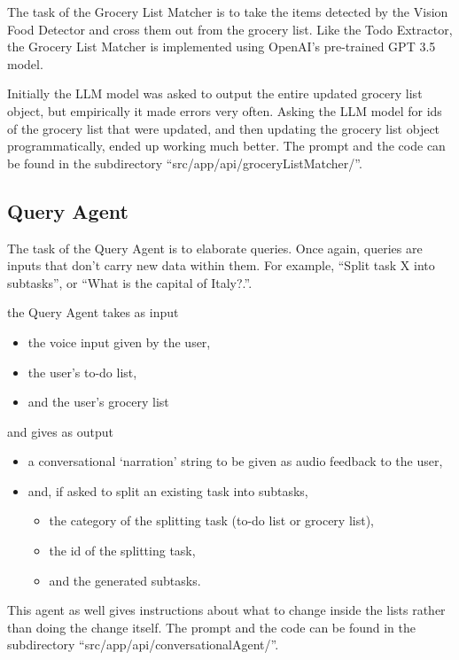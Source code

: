 \documentclass{article}
\begin{document}
The task of the Grocery List Matcher is to take the items detected by the Vision Food Detector and cross them out from the grocery list. Like the Todo Extractor, the Grocery List Matcher is implemented using OpenAI's pre-trained GPT 3.5 model.


Initially the LLM model was asked to output the entire updated grocery list object, but empirically it made errors very often.
Asking the LLM model for ids of the grocery list that were updated, and then updating the grocery list object programmatically, ended up working much better. The prompt and the code can be found in the subdirectory ``src/app/api/groceryListMatcher/''.

\subsection*{\color{draculayellow}Query Agent}

The task of the Query Agent is to elaborate queries. Once again, queries are inputs that don't carry new data within them. For example, ``Split task X into subtasks'', or ``What is the capital of Italy?.''.

the Query Agent takes as input
\begin{itemize}
  \item the voice input given by the user,
  \item the user's to-do list,
  \item and the user's grocery list
\end{itemize}
and gives as output
\begin{itemize}
  \item a conversational `narration' string to be given as audio feedback to the user,
  \item and, if asked to split an existing task into subtasks,
  \begin{itemize}
    \item the category of the splitting task (to-do list or grocery list),
    \item the id of the splitting task,
    \item and the generated subtasks.
  \end{itemize}
\end{itemize}

This agent as well gives instructions about what to change inside the lists rather than doing the change itself. The prompt and the code can be found in the subdirectory ``src/app/api/conversationalAgent/''.
\end{document}
